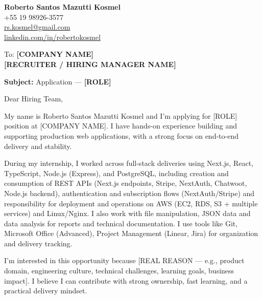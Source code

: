 \documentclass{article}
\begin{document}
\begin{center}
\textbf{Roberto Santos Mazutti Kosmel} \\
+55 19 98926-3577 \\
\href{mailto:rs.kosmel@gmail.com}{rs.kosmel@gmail.com} \\
\href{https://www.linkedin.com/in/robertokosmel/}{linkedin.com/in/robertokosmel}
\end{center}

\vspace{2mm}

To: \textbf{[COMPANY NAME]} \\
\textbf{[RECRUITER / HIRING MANAGER NAME]} \\

\vspace{2mm}

\textbf{Subject:} Application — \textbf{[ROLE]}

\vspace{4mm}

Dear Hiring Team,

\vspace{2mm}

My name is Roberto Santos Mazutti Kosmel and I'm applying for [ROLE] position at [COMPANY NAME]. I have hands-on experience building and supporting production web applications, with a strong focus on end-to-end delivery and stability.

\vspace{2mm}

During my internship, I worked across full-stack deliveries using Next.js, React, TypeScript, Node.js (Express), and PostgreSQL, including creation and consumption of REST APIs (Next.js endpoints, Stripe, NextAuth, Chatwoot, Node.js backend), authentication and subscription flows (NextAuth/Stripe) and responsibility for deployment and operations on AWS (EC2, RDS, S3 + multiple services) and Linux/Nginx. I also work with file manipulation, JSON data and data analysis for reports and technical documentation. I use tools like Git, Microsoft Office (Advanced), Project Management (Linear, Jira) for organization and delivery tracking.

\vspace{2mm}

I'm interested in this opportunity because [REAL REASON — e.g., product domain, engineering culture, technical challenges, learning goals, business impact]. I believe I can contribute with strong ownership, fast learning, and a practical delivery mindset.
\end{document}
